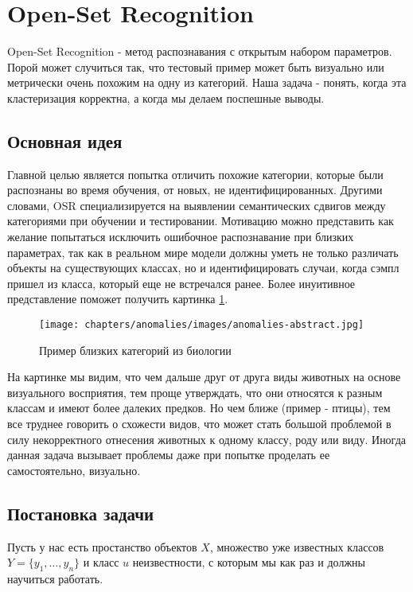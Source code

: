 \section{Open-Set Recognition}

Open-Set Recognition - метод распознавания с открытым набором параметров.
Порой может случиться так, что тестовый пример может быть визуально или метрически очень похожим на одну из категорий.
Наша задача - понять, когда эта кластеризация корректна, а когда мы делаем поспешные выводы.

\subsection{Основная идея}
Главной целью является попытка отличить похожие категории, которые были распознаны во время обучения, от новых, не идентифицированных. 
Другими словами, OSR специализируется на выявлении семантических сдвигов между категориями при обучении и тестировании.
Мотивацию можно представить как желание попытаться исключить ошибочное распознавание при близких параметрах, так как в реальном мире модели должны уметь не только различать объекты на существующих классах, но и идентифицировать случаи, когда сэмпл пришел из класса, который еще не встречался ранее.
Более инуитивное представление поможет получить картинка \ref{fig:anomalies-abstract}.

\begin{figure}[ht]
	\centering
	\texttt{[image: chapters/anomalies/images/anomalies-abstract.jpg]}
	\caption{Пример близких категорий из биологии}
	\label{fig:anomalies-abstract}
\end{figure}

На картинке мы видим, что чем дальше друг от друга виды животных на основе визуального восприятия, тем проще утверждать, что они относятся к разным классам и имеют более далеких предков.
Но чем ближе (пример - птицы), тем все труднее говорить о схожести видов, что может стать большой проблемой в силу некорректного отнесения животных к одному классу, роду или виду.
Иногда данная задача вызывает проблемы даже при попытке проделать ее самостоятельно, визуально.

\subsection{Постановка задачи}
Пусть у нас есть простанство объектов $X$, множество уже известных классов $Y = \{y_1, \dots, y_n\}$ и класс $u$ неизвестности, с которым мы как раз и должны научиться работать.


